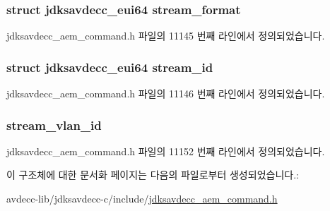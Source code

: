 \subsubsection[{\texorpdfstring{stream\+\_\+format}{stream_format}}]{\setlength{\rightskip}{0pt plus 5cm}struct {\bf jdksavdecc\+\_\+eui64} stream\+\_\+format}\hypertarget{structjdksavdecc__aem__command__set__stream__info__response_a77359be54ea386b1da66597746709ed0}{}\label{structjdksavdecc__aem__command__set__stream__info__response_a77359be54ea386b1da66597746709ed0}


jdksavdecc\+\_\+aem\+\_\+command.\+h 파일의 11145 번째 라인에서 정의되었습니다.

\subsubsection[{\texorpdfstring{stream\+\_\+id}{stream_id}}]{\setlength{\rightskip}{0pt plus 5cm}struct {\bf jdksavdecc\+\_\+eui64} stream\+\_\+id}\hypertarget{structjdksavdecc__aem__command__set__stream__info__response_af4c017686a11885d1d514c21bcde8160}{}\label{structjdksavdecc__aem__command__set__stream__info__response_af4c017686a11885d1d514c21bcde8160}


jdksavdecc\+\_\+aem\+\_\+command.\+h 파일의 11146 번째 라인에서 정의되었습니다.

\subsubsection[{\texorpdfstring{stream\+\_\+vlan\+\_\+id}{stream_vlan_id}}]{ stream\+\_\+vlan\+\_\+id}\hypertarget{structjdksavdecc__aem__command__set__stream__info__response_a6ad38338505a58fc768e6fb6caf18a22}{}\label{structjdksavdecc__aem__command__set__stream__info__response_a6ad38338505a58fc768e6fb6caf18a22}


jdksavdecc\+\_\+aem\+\_\+command.\+h 파일의 11152 번째 라인에서 정의되었습니다.



이 구조체에 대한 문서화 페이지는 다음의 파일로부터 생성되었습니다.\+:\begin{DoxyCompactItemize}
\item 
avdecc-\/lib/jdksavdecc-\/c/include/\hyperlink{jdksavdecc__aem__command_8h}{jdksavdecc\+\_\+aem\+\_\+command.\+h}\end{DoxyCompactItemize}
